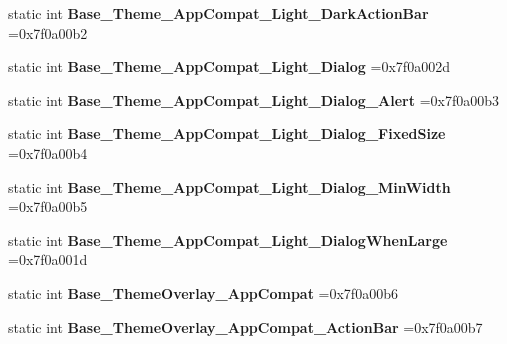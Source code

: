 \begin{DoxyCompactItemize}
static int {\bfseries Base\+\_\+\+Theme\+\_\+\+App\+Compat\+\_\+\+Light\+\_\+\+Dark\+Action\+Bar} =0x7f0a00b2
\item 
\mbox{\label{classandroid_1_1support_1_1v7_1_1cardview_1_1R_1_1style_aa76d3358045ad067ea29c1c9e3edea40}} 
static int {\bfseries Base\+\_\+\+Theme\+\_\+\+App\+Compat\+\_\+\+Light\+\_\+\+Dialog} =0x7f0a002d
\item 
\mbox{\label{classandroid_1_1support_1_1v7_1_1cardview_1_1R_1_1style_afb5e3ad8b89def97f71510484d4c4456}} 
static int {\bfseries Base\+\_\+\+Theme\+\_\+\+App\+Compat\+\_\+\+Light\+\_\+\+Dialog\+\_\+\+Alert} =0x7f0a00b3
\item 
\mbox{\label{classandroid_1_1support_1_1v7_1_1cardview_1_1R_1_1style_af4a3e6be2895676c4fe9b3a507954e3d}} 
static int {\bfseries Base\+\_\+\+Theme\+\_\+\+App\+Compat\+\_\+\+Light\+\_\+\+Dialog\+\_\+\+Fixed\+Size} =0x7f0a00b4
\item 
\mbox{\label{classandroid_1_1support_1_1v7_1_1cardview_1_1R_1_1style_a6111cbf4614d12c656ea0f581a5c9d4b}} 
static int {\bfseries Base\+\_\+\+Theme\+\_\+\+App\+Compat\+\_\+\+Light\+\_\+\+Dialog\+\_\+\+Min\+Width} =0x7f0a00b5
\item 
\mbox{\label{classandroid_1_1support_1_1v7_1_1cardview_1_1R_1_1style_ae5009857b519d0ff212c2ddfa4399d47}} 
static int {\bfseries Base\+\_\+\+Theme\+\_\+\+App\+Compat\+\_\+\+Light\+\_\+\+Dialog\+When\+Large} =0x7f0a001d
\item 
\mbox{\label{classandroid_1_1support_1_1v7_1_1cardview_1_1R_1_1style_aeff6374aee7086099ef8503cdd17bb14}} 
static int {\bfseries Base\+\_\+\+Theme\+Overlay\+\_\+\+App\+Compat} =0x7f0a00b6
\item 
\mbox{\label{classandroid_1_1support_1_1v7_1_1cardview_1_1R_1_1style_aef1733455bff47284b692822c4ba9625}} 
static int {\bfseries Base\+\_\+\+Theme\+Overlay\+\_\+\+App\+Compat\+\_\+\+Action\+Bar} =0x7f0a00b7

\end{DoxyCompactItemize}
